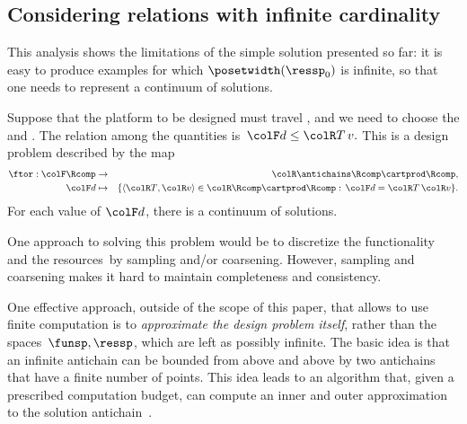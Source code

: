 \subsection{Considering relations with infinite cardinality}

This analysis shows the limitations of the simple solution presented
so far: it is easy to produce examples for which $\posetwidth(\ressp_{0})$
is infinite, so that one needs to represent a continuum of solutions.

\begin{example}
    Suppose that the platform to be designed must travel , and we need to choose the 
    and .
    The relation among the quantities
    is~${\colF d}\leq{\colR T\,v}.$ This is a design problem described
    by the map
    \begin{eqnarray*}
        \ftor:{\colF\Rcomp} & \rightarrow & {\colR\antichains\Rcomp\cartprod\Rcomp,}\\
        {\colF d} & \mapsto & \{\langle{\colR T},{\colR v}\rangle\in{\colR\Rcomp\cartprod\Rcomp}:\,{\colF d}={\colR T}\,{\colR v}\}.
    \end{eqnarray*}
    For each value of ${\colF d}$, there is a continuum of solutions.
\end{example}
One approach to solving this problem would be to discretize the functionality~\funsp
and the resources~\ressp by sampling and/or coarsening.
However,
sampling and coarsening makes it hard to maintain completeness and
consistency.

One effective approach, outside of the scope of this paper, that allows
to use finite computation is to \emph{approximate the design problem}
\emph{itself}, rather than the spaces~$\funsp,\ressp$, which are
left as possibly infinite.
The basic idea is that an infinite antichain
can be bounded from above and above by two antichains that have a
finite number of points.
This idea leads to an algorithm that, given
a prescribed computation budget, can compute an inner and outer approximation
to the solution antichain~\cite{mcdp_icra_uncertainty_arxiv}.

